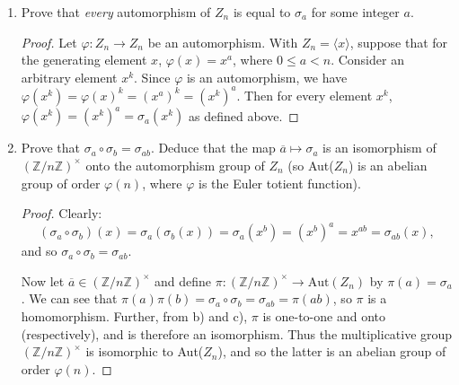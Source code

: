 \documentclass{article}
\begin{document}
\begin{enumerate}[label=(\alph*), itemsep=0em]
\begin{proof}
            Next, let $\sigma_a = \sigma_b$ (to show that $a \equiv b$ (mod $n$)). Then for each $x^k \in Z_n$, $\sigma_a(x^k) = \sigma_b(x^k)$. This implies that $x^{ak} = x^{bk}$, and so $ak \equiv bk$ (mod $n$) for each $k \in \mathbb{Z}$. For $k$ relatively prime to $n$, this in turn implies that $a \equiv b$.
          \end{proof}
    \item Prove that \emph{every} automorphism of $Z_n$ is equal to $\sigma_a$ for some integer $a$.
          \begin{proof}
            Let $\varphi: Z_n \rightarrow Z_n$ be an automorphism. With $Z_n = \langle x \rangle$, suppose that for the generating element $x$, $\varphi(x) = x^a$, where $0 \leq a < n$. Consider an arbitrary element $x^k$. Since $\varphi$ is an automorphism, we have $\varphi(x^k) = \varphi(x)^k = (x^a)^k = (x^k)^a$. Then for every element $x^k$, $\varphi(x^k) = (x^k)^a = \sigma_a(x^k)$ as defined above.
          \end{proof}
    \item Prove that $\sigma_a \circ \sigma_b = \sigma_{ab}$. Deduce that the map $\overline{a} \mapsto \sigma_a$ is an isomorphism of $(\mathbb{Z}/n\mathbb{Z})^\times$ onto the automorphism group of $Z_n$ (so Aut($Z_n$) is an abelian group of order $\varphi(n)$, where $\varphi$ is the Euler totient function).
          \begin{proof}
            Clearly:
            \begin{equation*}
                (\sigma_a \circ \sigma_b)(x) = \sigma_a(\sigma_b(x)) = \sigma_a(x^b) = (x^b)^a = x^{ab} = \sigma_{ab}(x),
            \end{equation*}
            and so $\sigma_a \circ \sigma_b = \sigma_{ab}$.

            Now let $\overline{a} \in (\mathbb{Z}/n\mathbb{Z})^\times$ and define $\pi: (\mathbb{Z}/n\mathbb{Z})^\times \rightarrow \text{Aut}(Z_n)$ by $\pi(a) = \sigma_a$. We can see that $\pi(a)\pi(b) = \sigma_a \circ \sigma_b = \sigma_{ab} = \pi(ab)$, so $\pi$ is a homomorphism. Further, from b) and c), $\pi$ is one-to-one and onto (respectively), and is therefore an isomorphism. Thus the multiplicative group $(\mathbb{Z}/n\mathbb{Z})^\times$ is isomorphic to Aut($Z_n$), and so the latter is an abelian group of order $\varphi(n)$.
          \end{proof}
\end{enumerate}
\end{document}
